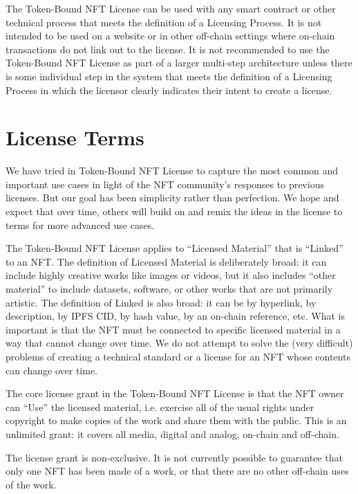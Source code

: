 \documentclass{article}
\newcommand{\iccclicense}{Token-Bound NFT License\xspace}
\begin{document}
The \iccclicense can be used with any smart contract or other technical process that meets the definition of a Licensing Process. It is not intended to be used on a website or in other off-chain settings where on-chain transactions do not link out to the license. It is not recommended to use the \iccclicense as part of a larger multi-step architecture unless there is some individual step in the system that meets the definition of a Licensing Process in which the licensor clearly indicates their intent to create a license.


\section{License Terms}

We have tried in \iccclicense to capture the most common and important use cases in light of the NFT community's responses to previous licenses. But our goal has been simplicity rather than perfection. We hope and expect that over time, others will build on and remix the ideas in the license to terms for more advanced use cases.

The \iccclicense applies to ``Licensed Material'' that is ``Linked'' to an NFT. The definition of Licensed Material is deliberately broad: it can include highly creative works like images or videos, but it also includes ``other material'' to include datasets, software, or other works that are not primarily artistic. The definition of Linked is also broad: it can be by hyperlink, by description, by IPFS CID, by hash value, by an on-chain reference, etc. What is important is that the NFT must be connected to specific licensed material in a way that cannot change over time. We do not attempt to solve the (very difficult) problems of creating a technical standard or a license for an NFT whose contents can change over time.

The core license grant in the \iccclicense is that the NFT owner can ``Use'' the licensed material, i.e. exercise all of the usual rights under copyright to make copies of the work and share them with the public. This is an unlimited grant: it covers all media, digital and analog, on-chain and off-chain. 

The license grant is non-exclusive. It is not currently possible to guarantee that only one NFT has been made of a work, or that there are no other off-chain uses of the work.
\end{document}
